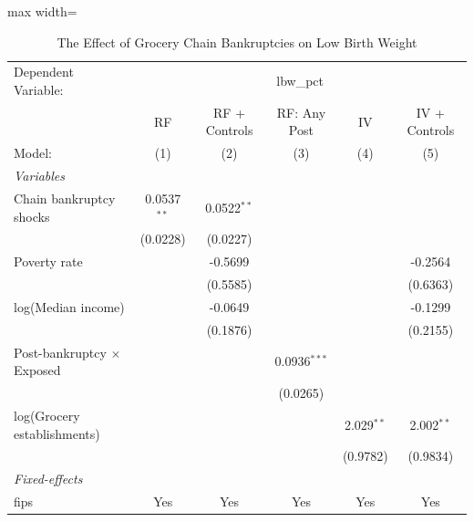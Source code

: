 
\begin{table}[htbp]
   \caption{\label{tab:main} The Effect of Grocery Chain Bankruptcies on Low Birth Weight}
   \centering
   \begin{adjustbox}{max width=\textwidth}
   \begin{tabular}{lccccc}
      \tabularnewline \midrule \midrule
      Dependent Variable: & \multicolumn{5}{c}{lbw\_pct}\\
                                        & RF            & RF + Controls & RF: Any Post   & IV           & IV + Controls \\   
      Model:                            & (1)           & (2)           & (3)            & (4)          & (5)\\  
      \midrule
      \emph{Variables}\\
      Chain bankruptcy shocks           & 0.0537$^{**}$ & 0.0522$^{**}$ &                &              &   \\   
                                        & (0.0228)      & (0.0227)      &                &              &   \\   
      Poverty rate                      &               & -0.5699       &                &              & -0.2564\\   
                                        &               & (0.5585)      &                &              & (0.6363)\\   
      log(Median income)                &               & -0.0649       &                &              & -0.1299\\   
                                        &               & (0.1876)      &                &              & (0.2155)\\   
      Post-bankruptcy $\times$ Exposed  &               &               & 0.0936$^{***}$ &              &   \\   
                                        &               &               & (0.0265)       &              &   \\   
      log(Grocery establishments)       &               &               &                & 2.029$^{**}$ & 2.002$^{**}$\\   
                                        &               &               &                & (0.9782)     & (0.9834)\\   
      \midrule
      \emph{Fixed-effects}\\
      fips                              & Yes           & Yes           & Yes            & Yes          & Yes\\  

\end{tabular}
\end{adjustbox}
\end{table}
